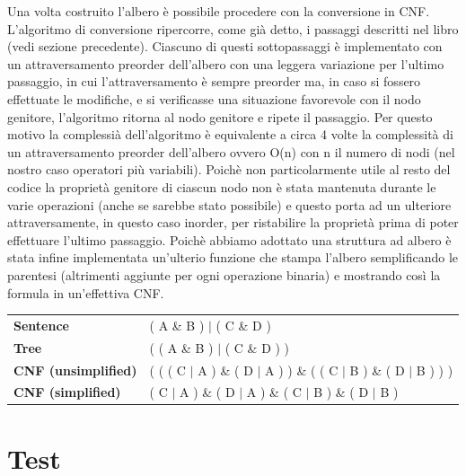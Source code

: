 \documentclass{article} %
\begin{document}
\noindent Una volta costruito l'albero è possibile procedere con la conversione in CNF. L'algoritmo di conversione ripercorre, come già detto, i passaggi descritti nel libro (vedi sezione precedente).
Ciascuno di questi sottopassaggi è implementato con un attraversamento preorder dell'albero con una leggera variazione per l'ultimo passaggio, in cui l'attraversamento è sempre preorder ma, in caso si fossero effettuate le modifiche, e si verificasse una situazione favorevole con il nodo genitore, l'algoritmo ritorna al nodo genitore e ripete il passaggio.
Per questo motivo la complessià dell'algoritmo è equivalente a circa 4 volte la complessità di un attraversamento preorder dell'albero ovvero O(n) con n il numero di nodi (nel nostro caso operatori più variabili). Poichè non particolarmente utile al resto del codice la proprietà genitore di ciascun nodo non è stata mantenuta durante le varie operazioni (anche se sarebbe stato possibile) e questo porta ad un ulteriore attraversamente, in questo caso inorder, per ristabilire la proprietà prima di poter effettuare l'ultimo passaggio.
Poichè abbiamo adottato una struttura ad albero è stata infine implementata un'ulterio funzione che stampa l'albero semplificando le parentesi (altrimenti aggiunte per ogni operazione binaria) e mostrando così la formula in un'effettiva CNF.

\vspace{0.5cm}

\begin{tabular}{|p{3cm}|p{7cm}|}
    \footnotesize \textbf{Sentence} & \footnotesize ( A \& B ) $|$ ( C \& D ) \\
    \footnotesize \textbf{Tree} & \footnotesize ( ( A \& B ) $|$ ( C \& D ) ) \\
    \footnotesize \textbf{CNF (unsimplified)} & \footnotesize ( ( ( C $|$ A ) \& ( D $|$ A ) ) \& ( ( C $|$ B ) \& ( D $|$ B ) ) ) \\
    \footnotesize \textbf{CNF (simplified)} & \footnotesize ( C $|$ A ) \& ( D $|$ A ) \& ( C $|$ B ) \& ( D $|$ B ) \\
\end{tabular}

\vspace{0.5cm}

\section*{Test} 
\end{document}
